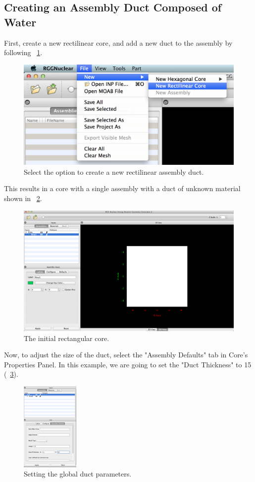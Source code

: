 \subsection{Creating an Assembly Duct Composed of Water}

First, create a new rectilinear core, and add a new duct to the assembly by following ~\ref{fig:Rect1}.

\begin{figure}[htb]
\begin{center}
\includegraphics[width=0.5\linewidth]{Images/rect-1e1.png}
\caption{Select the option to create a new rectilinear assembly duct.}
\label{fig:Rect1}
\end{center}
\end{figure}

This results in a core with a single assembly with a duct of unknown material shown in ~\ref{fig:NewRect}.

\begin{figure}[htb]
\begin{center}
\includegraphics[width=0.5\linewidth]{Images/rect-init-model.png}
\caption{The initial rectangular core.}
\label{fig:NewRect}
\end{center}
\end{figure}

Now, to adjust the size of the duct, select the "Assembly Defaults" tab in Core's Properties Panel.  In this example, we are going to set the "Duct Thickness" to 15 (~\ref{fig:SetRectDuctDem}).

\begin{figure}
  \begin{center}
    \includegraphics[width=0.25\textwidth]{Images/rect-set-dim.png}
  \end{center}
 \caption{Setting the global duct parameters.}
\label{fig:SetRectDuctDem}
\end{figure}

